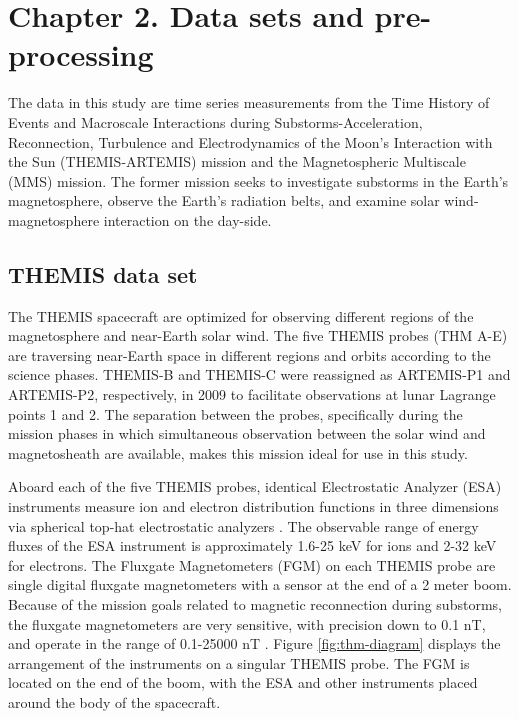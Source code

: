 \chapter{Chapter 2. Data sets and pre-processing}\label{ch:ch2_data}

The data in this study are time series measurements from the Time History of Events and Macroscale Interactions during Substorms-Acceleration, Reconnection, Turbulence and Electrodynamics of the Moon’s Interaction with the Sun (\gls{THEMIS}-ARTEMIS) mission and the Magnetospheric Multiscale (\gls{MMS}) mission. The former mission seeks to investigate substorms in the Earth's magnetosphere, observe the Earth's radiation belts, and examine solar wind-magnetosphere interaction on the day-side. 


\section{THEMIS data set}
The THEMIS spacecraft are optimized for observing different regions of the magnetosphere and near-Earth solar wind. The five THEMIS probes (THM A-E) are traversing near-Earth space in different regions and orbits according to the science phases. THEMIS-B and THEMIS-C were reassigned as ARTEMIS-P1 and ARTEMIS-P2, respectively, in 2009 to facilitate observations at lunar Lagrange points 1 and 2. The separation between the probes, specifically during the mission phases in which simultaneous observation between the solar wind and magnetosheath are available, makes this mission ideal for use in this study.

Aboard each of the five THEMIS probes, identical Electrostatic Analyzer (ESA) instruments measure ion and electron distribution functions in three dimensions via spherical top-hat electrostatic analyzers \citep{McFadden:2008}. The observable range of energy fluxes of the ESA instrument is approximately 1.6-25 keV for ions and 2-32 keV for electrons. The Fluxgate Magnetometers (FGM) on each THEMIS probe \citep{Auster:2008} are single digital fluxgate magnetometers with a sensor at the end of a 2 meter boom. Because of the mission goals related to magnetic reconnection during substorms, the fluxgate magnetometers are very sensitive, with precision down to 0.1 nT, and operate in the range of 0.1-25000 nT \citep{Auster:2008}. Figure \ref{fig:thm-diagram} displays the arrangement of the instruments on a singular THEMIS probe. The FGM is located on the end of the boom, with the ESA and other instruments placed around the body of the spacecraft.

